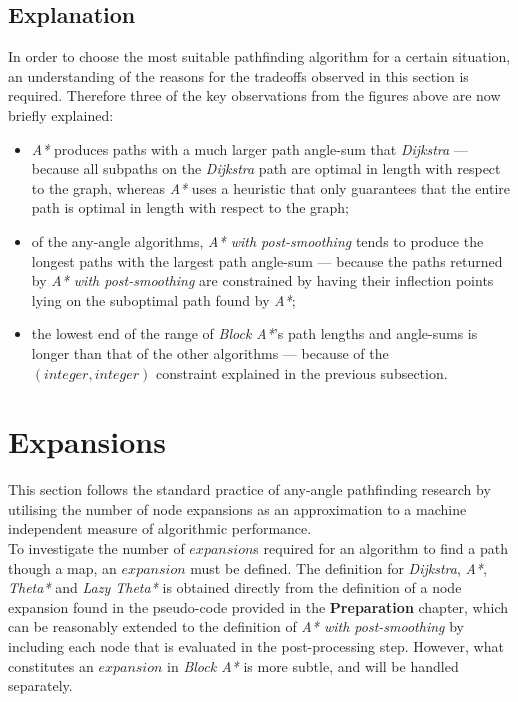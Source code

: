 \documentclass[12pt,notitlepage]{report}
\begin{document}
\subsection{Explanation}
In order to choose the most suitable pathfinding algorithm for a certain situation, an understanding of the reasons for the tradeoffs observed in this section is required. Therefore three of the key observations from the figures above are now briefly explained: 
\begin{itemize}
\item {\em A*} produces paths with a much larger path angle-sum that {\em Dijkstra} --- because all subpaths on the {\em Dijkstra} path are optimal in length with respect to the graph, whereas {\em A*} uses a heuristic that only guarantees that the entire path is optimal in length with respect to the graph;
\item of the any-angle algorithms, {\em A* with post-smoothing} tends to produce the longest paths with the largest path angle-sum --- because the paths returned by {\em A* with post-smoothing} are constrained by having their inflection points lying on the suboptimal path found by {\em A*};
\item the lowest end of the range of {\em Block A*}'s path lengths and angle-sums is longer than that of the other algorithms --- because of the $(integer,integer)$ constraint explained in the previous subsection. 
\end{itemize}

\section{Expansions}
This section follows the standard\cite{Nash12} practice of any-angle pathfinding research by utilising the number of node expansions as an approximation to a machine independent measure of algorithmic performance.\\

\noindent
To investigate the number of $expansion$s required for an algorithm  to find a path though a map, an $expansion$ must be defined. The definition for {\em Dijkstra}, {\em A*}, {\em Theta*} and {\em Lazy Theta*} is obtained directly from the definition of a node expansion found in the pseudo-code provided in the {\bfseries Preparation} chapter, which can be reasonably extended to the definition of {\em A* with post-smoothing} by including each node that is evaluated in the post-processing step. However, what constitutes an $expansion$ in {\em Block A*} is more subtle, and will be handled separately.\\
\end{document}
